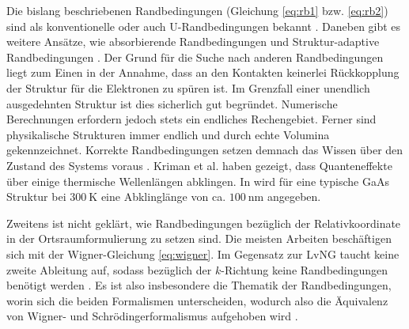 Die bislang beschriebenen Randbedingungen (Gleichung \eqref{eq:rb1} bzw. \eqref{eq:rb2}) sind als konventionelle oder auch U-Randbedingungen bekannt \cite{failure}. Daneben gibt es weitere Ansätze, wie absorbierende Randbedingungen \cite{arnold1994absorbing, lukas2, lukas1} und Struktur-adaptive Randbedingungen \cite{jiang2014device}. Der Grund für die Suche nach anderen Randbedingungen liegt zum Einen in der Annahme, dass an den Kontakten keinerlei Rückkopplung der Struktur  für die Elektronen zu spüren ist. Im Grenzfall einer unendlich ausgedehnten Struktur ist dies sicherlich gut begründet. Numerische Berechnungen erfordern jedoch stets ein endliches Rechengebiet. Ferner sind physikalische Strukturen immer endlich und durch echte Volumina gekennzeichnet. Korrekte Randbedingungen setzen demnach das Wissen über den Zustand des Systems voraus \cite{ringhofer}.
Kriman et al. \cite{kriman1987scattering} haben gezeigt, dass Quanteneffekte über einige thermische Wellenlängen abklingen. In \cite{ringhofer} wird für eine typische GaAs Struktur bei $\SI{300}{\kelvin}$ eine Abklinglänge von ca. $\SI{100}{\nano\meter}$ angegeben.

Zweitens ist nicht geklärt, wie Randbedingungen bezüglich der Relativkoordinate in der Ortsraumformulierung zu setzen sind. Die meisten Arbeiten beschäftigen sich mit der Wigner-Gleichung \eqref{eq:wigner}. Im Gegensatz zur LvNG taucht keine zweite Ableitung auf, sodass bezüglich der $k$-Richtung keine Randbedingungen benötigt werden \cite{frensley2}.
Es ist also insbesondere die Thematik der Randbedingungen, worin sich die beiden Formalismen unterscheiden, wodurch also die Äquivalenz von Wigner- und Schrödingerformalismus aufgehoben wird \cite{li2014stationary}.

